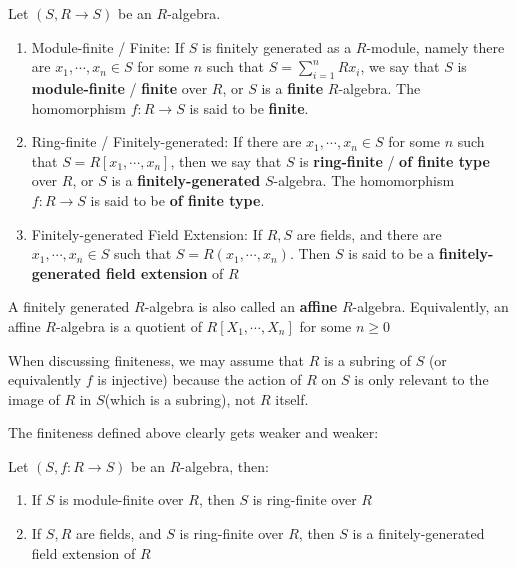 \documentclass{note-eng}
\begin{document}
\begin{definition}[Finiteness]
    Let $(S, R \rightarrow S)$ be an $R$-algebra.
    \begin{enumerate}
        \item Module-finite / Finite: If $S$ is finitely generated as a $R$-module, namely there are $x_1, \cdots, x_n \in S$ for some $n$ such that $S = \sum\limits_{i = 1}^{n} R x_i$, we say that $S$ is \textbf{module-finite} / \textbf{finite} over $R$, or $S$ is a \textbf{finite} $R$-algebra. The homomorphism $f: R \rightarrow S$ is said to be \textbf{finite}.
        \item Ring-finite / Finitely-generated: If there are $x_1, \cdots, x_n \in S$ for some $n$ such that $S = R[x_1, \cdots, x_n]$, then we say that $S$ is \textbf{ring-finite} / \textbf{of finite type} over $R$, or $S$ is a \textbf{finitely-generated} $S$-algebra. The homomorphism $f: R \rightarrow S$ is said to be \textbf{of finite type}.
        \item Finitely-generated Field Extension: If $R, S$ are fields, and there are $x_1, \cdots, x_n \in S$ such that $S = R(x_1, \cdots, x_n)$. Then $S$ is said to be a \textbf{finitely-generated field extension} of $R$
    \end{enumerate}

    A finitely generated $R$-algebra is also called an \textbf{affine} $R$-algebra. Equivalently, an affine $R$-algebra is a quotient of $R[X_1, \cdots, X_n]$ for some $n \ge 0$
\end{definition}

\begin{remark}
    When discussing finiteness, we may assume that $R$ is a subring of $S$ (or equivalently $f$ is injective) because the action of $R$ on $S$ is only relevant to the image of $R$ in $S$(which is a subring), not $R$ itself.
\end{remark}

The finiteness defined above clearly gets weaker and weaker:

\begin{proposition}
    Let $(S, f: R \rightarrow S)$ be an $R$-algebra, then:
    \begin{enumerate}
        \item If $S$ is module-finite over $R$, then $S$ is ring-finite over $R$
        \item If $S, R$ are fields, and $S$ is ring-finite over $R$, then $S$ is a finitely-generated field extension of $R$
    \end{enumerate}
\end{proposition}
\end{document}
